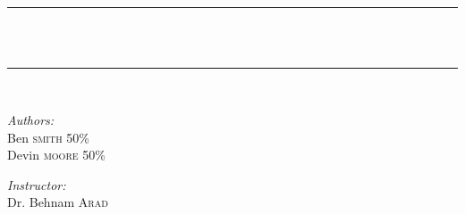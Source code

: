 \begin{titlepage}
	\begin{center}
		\vspace{20 cm}
		
		\textsc{\Large \COURSE}\\[1.3cm]
		\textsc{\Large \DUEDATE}\\[0.5cm]

		\vspace{5 mm}
		
		\rule{415pt}{2pt}\\
		{ \Huge \bfseries \TITLE \\[0.2cm] }
		\rule{415pt}{2pt}\\
		
		\vspace{10mm}
		
		\begin{minipage}{0.4\textwidth}
		\begin{flushleft} \Large
		
		\emph{Authors:}\\
			Ben	  	\textsc{smith} 50\% \\
			Devin	\textsc{moore} 50\%
		\end{flushleft}
		\end{minipage}
		\begin{minipage}{0.4\textwidth}
		\begin{flushright} \Large
		
		\emph{Instructor:} \\
			Dr. Behnam 	\textsc{Arad}
		\end{flushright}
		\end{minipage}
	\end{center}
	
	\vspace{25mm}
	
	\begin{center}
	\begin{minipage}{470pt}
		\begin{flushleft} \Large
			
		\end{flushleft}
		
		\begin{flushleft} \Large
		\end{flushleft}
	\end{minipage}
	\end{center}
	\vfill
		

\end{titlepage}
